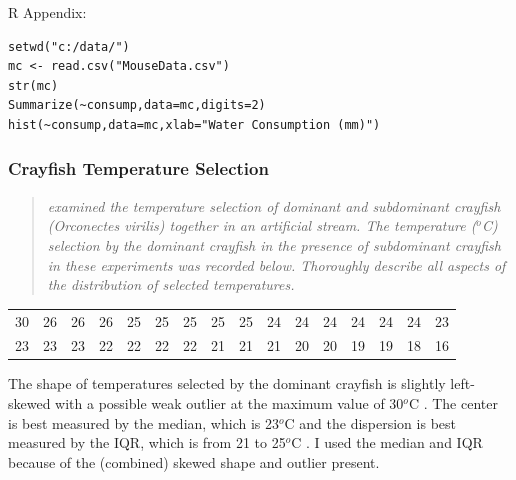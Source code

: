 \documentclass[10pt,openany]{book}\usepackage[]{graphicx}\usepackage[]{color}
\makeatletter
\newenvironment{kframe}{%
 \def\at@end@of@kframe{}%
 \ifinner\ifhmode%
  \def\at@end@of@kframe{\end{minipage}}%
  \begin{minipage}{\columnwidth}%
 \fi\fi%
 \def\FrameCommand##1{\hskip\@totalleftmargin \hskip-\fboxsep
 \colorbox{shadecolor}{##1}\hskip-\fboxsep
     \hskip-\linewidth \hskip-\@totalleftmargin \hskip\columnwidth}%
 \MakeFramed {\advance\hsize-\width
   \@totalleftmargin\z@ \linewidth\hsize
   \@setminipage}}%
 {\par\unskip\endMakeFramed%
 \at@end@of@kframe}
\newenvironment{knitrout}{}{} %
\makeatother
\begin{document}
\begin{minipage}{\textwidth}
R Appendix:
\begin{knitrout}
\color{fgcolor}\begin{kframe}
\begin{verbatim}
setwd("c:/data/")
mc <- read.csv("MouseData.csv")
str(mc)
Summarize(~consump,data=mc,digits=2)
hist(~consump,data=mc,xlab="Water Consumption (mm)")
\end{verbatim}
\end{kframe}
\end{knitrout}
\end{minipage}

\subsubsection{Crayfish Temperature Selection}
\begin{quote}
\textit{\cite{Peck1985} examined the temperature selection of dominant and subdominant crayfish (\textit{Orconectes virilis}) together in an artificial stream.  The temperature ($^{o}$C) selection by the dominant crayfish in the presence of subdominant crayfish in these experiments was recorded below.  Thoroughly describe all aspects of the distribution of selected temperatures.}
\end{quote}

\begin{tabular}{rrrrrrrrrrrrrrrr}
  30 & 26 & 26 & 26 & 25 & 25 & 25 & 25 & 25 & 24 & 24 & 24 & 24 & 24 & 24 & 23 \\ 
  23 & 23 & 23 & 22 & 22 & 22 & 22 & 21 & 21 & 21 & 20 & 20 & 19 & 19 & 18 & 16 \\ 
  \end{tabular}


The shape of temperatures selected by the dominant crayfish is slightly left-skewed  with a possible weak outlier at the maximum value of 30$^{o}$C .  The center is best measured by the median, which is 23$^{o}$C  and the dispersion is best measured by the IQR, which is from 21 to 25$^{o}$C .  I used the median and IQR because of the (combined) skewed shape and outlier present.
\end{document}
